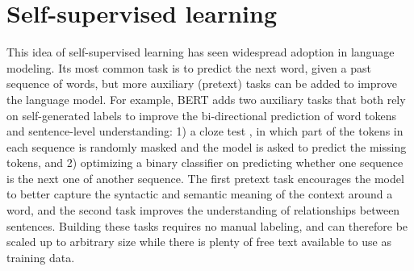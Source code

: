 \section{Self-supervised learning}
This idea of self-supervised learning has seen widespread adoption in language modeling. Its most common task is to predict the next word, given a past sequence of words, but more auxiliary (pretext) tasks can be added to improve the language model. For example, BERT \cite{Devlin2019BERTPO} adds two auxiliary tasks that both rely on self-generated labels to improve the bi-directional prediction of word tokens and sentence-level understanding: 1) a cloze test \cite{doi:10.1177/107769905303000401}, in which part of the tokens in each sequence is randomly masked and the model is asked to predict the missing tokens, and 2) optimizing a binary classifier on predicting whether one sequence is the next one of another sequence. The first pretext task encourages the model to better capture the syntactic and semantic meaning of the context around a word, and the second task improves the understanding of relationships between sentences. Building these tasks requires no manual labeling, and can therefore be scaled up to arbitrary size while there is plenty of free text available to use as training data. \\

